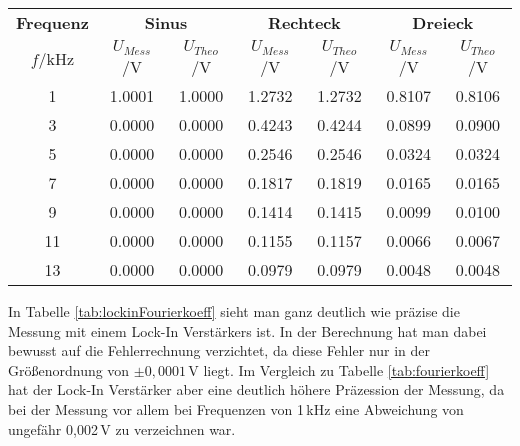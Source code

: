 \begin{center}
    \begin{tabular}{c | c c | c c | c c}
        \textbf{Frequenz} & \multicolumn{2}{c|}{\textbf{Sinus}} & \multicolumn{2}{c|}{\textbf{Rechteck}} & \multicolumn{2}{c}{\textbf{Dreieck}}\\
        $f$/kHz & $U_{Mess}$/V & $U_{Theo}$/V & $U_{Mess}$/V & $U_{Theo}$/V & $U_{Mess}$/V & $U_{Theo}$/V\\
        \hline
         1 &  1.0001 &  1.0000 & 1.2732 & 1.2732 & 0.8107 & 0.8106 \\
         3 &  0.0000 &  0.0000 & 0.4243 & 0.4244 & 0.0899 & 0.0900 \\
         5 &  0.0000 &  0.0000 & 0.2546 & 0.2546 & 0.0324 & 0.0324 \\
         7 &  0.0000 &  0.0000 & 0.1817 & 0.1819 & 0.0165 & 0.0165 \\
         9 &  0.0000 &  0.0000 & 0.1414 & 0.1415 & 0.0099 & 0.0100 \\
        11 &  0.0000 &  0.0000 & 0.1155 & 0.1157 & 0.0066 & 0.0067 \\
        13 &  0.0000 &  0.0000 & 0.0979 & 0.0979 & 0.0048 & 0.0048 \\
    \end{tabular}
    \label{tab:lockinFourierkoeff}
\end{center} 
In Tabelle \ref{tab:lockinFourierkoeff} sieht man ganz deutlich wie präzise die Messung mit einem Lock-In Verstärkers ist. In der Berechnung hat man dabei bewusst auf die Fehlerrechnung verzichtet, da diese Fehler nur in der Größenordnung von $\pm 0,0001$\,V liegt. Im Vergleich zu Tabelle \ref{tab:fourierkoeff} hat der Lock-In Verstärker aber eine deutlich höhere Präzession der Messung, da bei der Messung vor allem bei Frequenzen von 1\,kHz eine Abweichung von ungefähr 0,002\,V zu verzeichnen war.
\newpage
